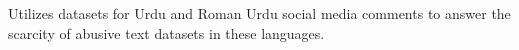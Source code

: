 Utilizes datasets for Urdu and Roman Urdu social media comments to answer the scarcity of abusive text datasets in these languages.
